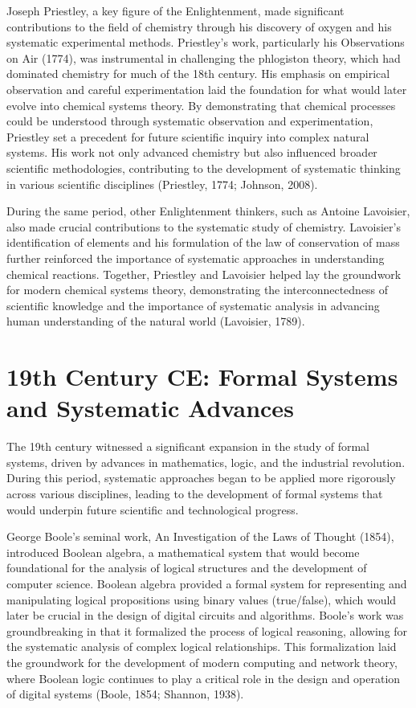 \documentclass[twocolumn]{article}
\begin{document}
\textcolor{primary}{Joseph Priestley, a key figure of the Enlightenment, made significant contributions to the field of chemistry through his discovery of oxygen and his systematic experimental methods. Priestley’s work, particularly his Observations on Air (1774), was instrumental in challenging the phlogiston theory, which had dominated chemistry for much of the 18th century. His emphasis on empirical observation and careful experimentation laid the foundation for what would later evolve into chemical systems theory. By demonstrating that chemical processes could be understood through systematic observation and experimentation, Priestley set a precedent for future scientific inquiry into complex natural systems. His work not only advanced chemistry but also influenced broader scientific methodologies, contributing to the development of systematic thinking in various scientific disciplines (Priestley, 1774; Johnson, 2008).}

\textcolor{secondary}{During the same period, other Enlightenment thinkers, such as Antoine Lavoisier, also made crucial contributions to the systematic study of chemistry. Lavoisier’s identification of elements and his formulation of the law of conservation of mass further reinforced the importance of systematic approaches in understanding chemical reactions. Together, Priestley and Lavoisier helped lay the groundwork for modern chemical systems theory, demonstrating the interconnectedness of scientific knowledge and the importance of systematic analysis in advancing human understanding of the natural world (Lavoisier, 1789).}

\section{19th Century CE: Formal Systems and Systematic Advances}

\textcolor{primary}{The 19th century witnessed a significant expansion in the study of formal systems, driven by advances in mathematics, logic, and the industrial revolution. During this period, systematic approaches began to be applied more rigorously across various disciplines, leading to the development of formal systems that would underpin future scientific and technological progress.}

\textcolor{secondary}{George Boole’s seminal work, An Investigation of the Laws of Thought (1854), introduced Boolean algebra, a mathematical system that would become foundational for the analysis of logical structures and the development of computer science. Boolean algebra provided a formal system for representing and manipulating logical propositions using binary values (true/false), which would later be crucial in the design of digital circuits and algorithms. Boole’s work was groundbreaking in that it formalized the process of logical reasoning, allowing for the systematic analysis of complex logical relationships. This formalization laid the groundwork for the development of modern computing and network theory, where Boolean logic continues to play a critical role in the design and operation of digital systems (Boole, 1854; Shannon, 1938).}
\end{document}
